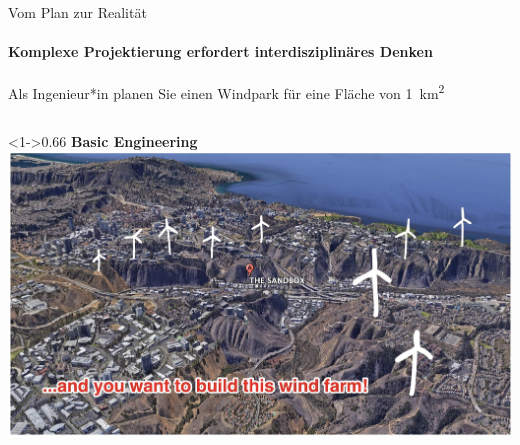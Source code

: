 \documentclass[aspectratio=169,11pt]{beamer}
\begin{document}
\begin{frame}{Vom Plan zur Realität}
	\framesubtitle{Komplexe Projektierung erfordert interdisziplinäres Denken}
  		Als Ingenieur*in planen Sie einen Windpark für eine Fläche von \qty{1}{\kilo\meter\squared} \\ [1em]
    \begin{columns}[T]
    	\begin{column}<1->{0.66\textwidth}
   			\textbf{Basic Engineering} \\
   			\includegraphics[width=1.\linewidth]{../img/planning_a_windfarm}
		\end{column}
    		

\end{columns}
\end{frame}
\end{document}
